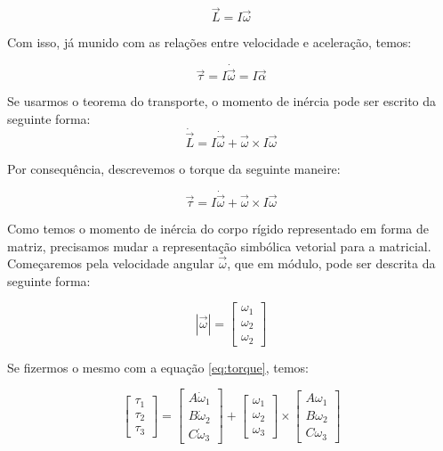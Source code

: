 \begin{equation}
\vec{L}=I\vec{\omega}
\end{equation}

Com isso, já munido com as relações entre velocidade e aceleração, temos:  

\begin{equation}\label{iomega}
\vec{\tau}=I\dot{\vec{\omega}}=I\vec{\alpha}
\end{equation}

Se usarmos o teorema do transporte, o momento de inércia pode ser escrito da seguinte forma:
\begin{equation}
\dot{\vec{L}}=I\dot{\vec{\omega}}+\vec{\omega}\times I \vec{\omega}
\end{equation}

Por consequência, descrevemos o torque da seguinte maneire:

\begin{equation}\label{eq:torque}
\vec{\tau}=I\dot{\vec{\omega}}+\vec{\omega}\times I \vec{\omega}
\end{equation}

Como temos o momento de inércia do corpo rígido representado em forma de matriz, precisamos mudar a representação simbólica vetorial para a matricial. Começaremos pela velocidade angular $\vec{\omega}$, que em módulo, pode ser descrita da seguinte forma:

\begin{equation}
\left|\vec{\omega}\right|=\begin{bmatrix}\omega_1\\\omega_2\\\omega_2\end{bmatrix}
\end{equation}

Se fizermos o mesmo com a equação \ref{eq:torque}, temos:

\begin{equation}
\begin{bmatrix}\tau_{1}\\\tau_{2}\\\tau_{3}\end{bmatrix}=\begin{bmatrix}A\dot{\omega}_{1}\\B\dot{\omega}_{2}\\C\dot{\omega}_{3}\end{bmatrix}+\begin{bmatrix}\omega_{1}\\\omega_{2}\\\omega_{3}\end{bmatrix}\times\begin{bmatrix}A\omega_{1}\\B\omega_{2}\\C\omega_{3}\end{bmatrix}
\end{equation}

